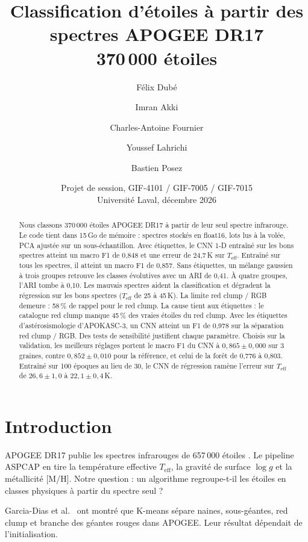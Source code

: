 \documentclass[11pt,a4paper]{article}
\title{\textbf{Classification d'étoiles à partir des spectres APOGEE DR17}\\[4pt]
\large 370\,000 étoiles}
\author{Félix Dubé \and Imran Akki \and Charles-Antoine Fournier \and Youssef Lahrichi \and Bastien Posez}
\date{Projet de session, GIF-4101 / GIF-7005 / GIF-7015\\Université Laval, décembre 2026}
\newcommand{\logg}{$\log g$}
\newcommand{\teff}{$T_{\mathrm{eff}}$}
\newcommand{\mh}{[M/H]}
\begin{document}
\maketitle

\begin{abstract}
\noindent Nous classons 370\,000 étoiles APOGEE DR17 à partir de leur seul spectre infrarouge. Le code tient dans 15\,Go de mémoire : spectres stockés en float16, lots lus à la volée, PCA ajustée sur un sous-échantillon. Avec étiquettes, le CNN 1-D entraîné sur les bons spectres atteint un macro F1 de 0,848 et une erreur de 24,7\,K sur \teff{}. Entraîné sur tous les spectres, il atteint un macro F1 de 0,857. Sans étiquettes, un mélange gaussien à trois groupes retrouve les classes évolutives avec un ARI de 0,41. À quatre groupes, l'ARI tombe à 0,10. Les mauvais spectres aident la classification et dégradent la régression sur les bons spectres (\teff{} de 25 à 45\,K). La limite red clump / RGB demeure : 58\,\% de rappel pour le red clump. La cause tient aux étiquettes : le catalogue red clump manque 45\,\% des vraies étoiles du red clump. Avec les étiquettes d'astérosismologie d'APOKASC-3, un CNN atteint un F1 de 0,978 sur la séparation red clump / RGB. Des tests de sensibilité justifient chaque paramètre. Choisis sur la validation, les meilleurs réglages portent le macro F1 du CNN à $0{,}865 \pm 0{,}000$ sur 3 graines, contre $0{,}852 \pm 0{,}010$ pour la référence, et celui de la forêt de 0,776 à 0,803. Entraîné sur 100 époques au lieu de 30, le CNN de régression ramène l'erreur sur \teff{} de $26{,}6 \pm 1{,}0$ à $22{,}1 \pm 0{,}4$\,K.
\end{abstract}

\tableofcontents
\newpage

\section{Introduction}

APOGEE DR17 publie les spectres infrarouges de 657\,000 étoiles \cite{dr17,majewski2017}. Le pipeline ASPCAP \cite{aspcap} en tire la température effective \teff{}, la gravité de surface \logg{} et la métallicité \mh{}. Notre question : un algorithme regroupe-t-il les étoiles en classes physiques à partir du spectre seul ?

Garcia-Dias et al.\ \cite{garciadias2018} ont montré que K-means sépare naines, sous-géantes, red clump et branche des géantes rouges dans APOGEE. Leur résultat dépendait de l'initialisation.
\end{document}
